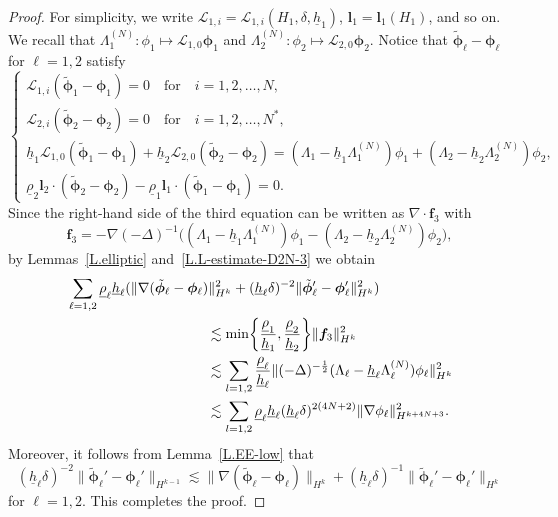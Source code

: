 \documentclass[11pt,leqno]{article}
\numberwithin{equation}{section}
\numberwithin{figure}{section}
\begin{document}
\begin{proof}
For simplicity, we write $\mathcal{L}_{1,i}=\mathcal{L}_{1,i}(H_1,\delta,\underline{h}_1)$, $\bm{l}_1=\bm{l}_1(H_1)$, and so on. 
We recall that $\Lambda_1^{(N)}\colon \phi_1 \mapsto \mathcal{L}_{1,0}\bm{\phi}_1$ and 
$\Lambda_2^{(N)}\colon \phi_2 \mapsto \mathcal{L}_{2,0}\bm{\phi}_2$. 
Notice that $\tilde{\bm{\phi}}_\ell-\bm{\phi}_\ell$ for $\ell=1,2$ satisfy 
%
\[
\begin{cases}
 \mathcal{L}_{1,i}(\tilde{\bm{\phi}}_1-\bm{\phi}_1)=0 \quad\mbox{for}\quad i=1,2,\ldots,N, \\
 \mathcal{L}_{2,i}(\tilde{\bm{\phi}}_2-\bm{\phi}_2)=0 \quad\mbox{for}\quad i=1,2,\ldots,N^*, \\
 \underline{h}_1\mathcal{L}_{1,0} (\tilde{\bm{\phi}}_1-\bm{\phi}_1)
  + \underline{h}_2\mathcal{L}_{2,0} (\tilde{\bm{\phi}}_2-\bm{\phi}_2)
  = (\Lambda_1-\underline{h}_1\Lambda_1^{(N)})\phi_1 + (\Lambda_2-\underline{h}_2\Lambda_2^{(N)})\phi_2, \\
 \underline{\rho}_2\bm{l}_2 \cdot (\tilde{\bm{\phi}}_2 - \bm{\phi}_2)
  - \underline{\rho}_1\bm{l}_1 \cdot (\tilde{\bm{\phi}}_1 - \bm{\phi}_1) = 0.
\end{cases}
\]
%
Since the right-hand side of the third equation can be written as $\nabla\cdot\bm{f}_3$ with 
%
\[
\bm{f}_3=-\nabla(-\Delta)^{-1}\bigl( (\Lambda_1-\underline{h}_1\Lambda_1^{(N)})\phi_1
 - (\Lambda_2-\underline{h}_2\Lambda_2^{(N)})\phi_2\bigr), 
\]
%
by Lemmas~\ref{L.elliptic} and~\ref{L.L-estimate-D2N-3} we obtain 
%
\begin{align*}
&\sum_{\ell=1,2}\underline{\rho}_\ell \underline{h}_\ell(
 \|\nabla(\tilde{\bm{\phi}}_\ell-\bm{\phi}_\ell)\|_{H^k}^2
 + (\underline{h}_\ell\delta)^{-2}\|\tilde{\bm{\phi}}_\ell'-\bm{\phi}_\ell'\|_{H^k}^2 ) \\
&\makebox[10em]{}\lesssim \min\biggl\{\frac{\underline{\rho}_1}{\underline{h}_1},\frac{\underline{\rho}_2}{\underline{h}_2} \biggr\}
  \|\bm{f}_3\|_{H^k}^2 \\
&\makebox[10em]{}\lesssim \sum_{l=1,2}\frac{\underline{\rho}_\ell}{\underline{h}_\ell}
 \|(-\Delta)^{-\frac12} (\Lambda_\ell-\underline{h}_\ell\Lambda_\ell^{(N)})\phi_\ell\|_{H^k}^2 \\
&\makebox[10em]{}\lesssim \sum_{l=1,2} \underline{\rho}_\ell \underline{h}_\ell 
 (\underline{h}_\ell\delta)^{2(4N+2)}\|\nabla\phi_\ell\|_{H^{k+4N+3}}^2. 
\end{align*}
%
Moreover, it follows from Lemma~\ref{L.EE-low} that 
%
\[
(\underline{h}_\ell\delta)^{-2}\|\tilde{\bm{\phi}}_\ell'-\bm{\phi}_\ell'\|_{H^{k-1}} 
 \lesssim \|\nabla(\tilde{\bm{\phi}}_\ell-\bm{\phi}_\ell)\|_{H^k}
 + (\underline{h}_\ell\delta)^{-1}\|\tilde{\bm{\phi}}_\ell'-\bm{\phi}_\ell'\|_{H^k}
\]
%
for $\ell=1,2$. 
This completes the proof. 
\end{proof}
\end{document}

